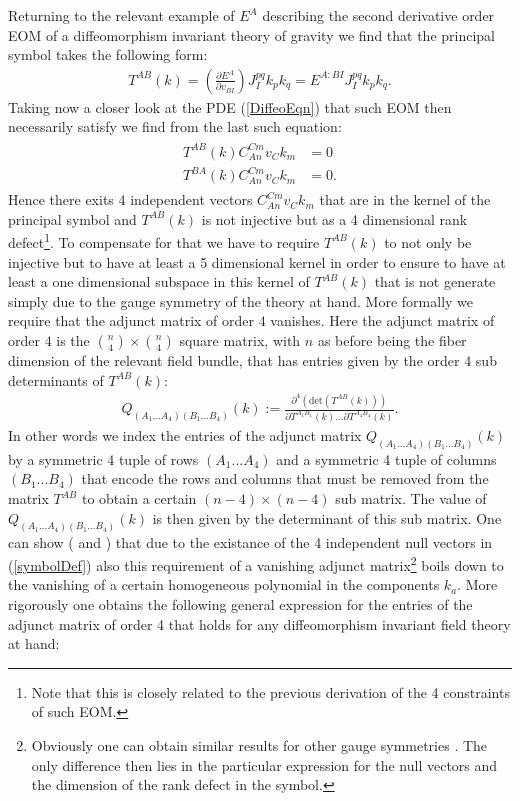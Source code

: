 \documentclass[a4paper,12pt, DIV=14, BCOR=5mm, twoside, headsepline, numbers=noenddot]{scrbook}
\begin{document}
Returning to the relevant example of $E^A$ describing the second derivative order EOM of a diffeomorphism invariant theory of gravity we find that the principal symbol takes the following form:
\begin{align}
    T^{A B} (k) = \left (\frac{\partial E^A}{\partial v_{BI}} \right )J_I^{pq} k_p k_q = E^{A: BI} J_I^{pq} k_p k_q.
\end{align}
Taking now a closer look at the PDE (\ref{DiffeoEqn}) that such EOM then necessarily  satisfy we find from the last such equation:
\begin{align}\label{symbolDef}
\begin{aligned}
    T^{A B} (k) C_{An}^{Cm}v_Ck_m &= 0 \\
    T^{B A} (k) C_{An}^{Cm}v_Ck_m &= 0 .
\end{aligned}
\end{align}
Hence there exits 4 independent vectors $C_{An}^{Cm}v_Ck_m$ that are in the kernel of the principal symbol and $T^{AB}(k)$ is not injective but as a 4 dimensional rank defect\footnote{Note that this is closely related to the previous derivation of the 4 constraints of such EOM.}. To compensate for that we have to require $T^{AB}(k)$ to not only be injective but to have at least a 5 dimensional kernel in order to ensure to have at least a one dimensional subspace in this kernel of $T^{AB}(k)$ that is not generate simply due to the gauge symmetry of the theory at hand. More formally we require that the adjunct matrix of order $4$ vanishes. Here the adjunct matrix of order $4$ is the $\binom{n}{4} \times \binom{n}{4}$ square matrix, with $n$ as before being the fiber dimension of the relevant field bundle, that has entries given by the order $4$ sub determinants of $T^{AB}(k)$:
\begin{align}\label{MinorDef}
    Q_{(A_1...A_4) (B_1...B_4)}(k) := \frac{\partial^4 (\mathrm{det}(T^{AB}(k)))}{\partial T^{A_1 B_1}(k) ... \partial T^{A_4 B_4}(k)}.
\end{align}
In other words we index the entries of the adjunct matrix $Q_{(A_1...A_4) (B_1...B_4)}(k)$ by a symmetric 4 tuple of rows $(A_1...A_4)$ and a symmetric 4 tuple of columns $(B_1...B_4)$ that encode the rows and columns that must be removed from the matrix $T^{AB}$ to obtain a certain $(n-4) \times (n-4)$ sub matrix. The value of $Q_{(A_1...A_4) (B_1...B_4)}(k)$ is then given by the determinant of this sub matrix. 
%
%
%
One can show (\cite{2018PhRvD..97h4036D} and \cite{2009JPhA...42U5402I}) that due to the existance of the 4 independent null vectors in (\ref{symbolDef}) also this requirement of a vanishing adjunct matrix\footnote{Obviously one can obtain similar results for other gauge symmetries \cite{2018PhRvD..97h4036D}. The only difference then lies in the particular expression for the null vectors and the dimension of the rank defect in the symbol.} boils down to the vanishing of a certain homogeneous polynomial in the components $k_a$. More rigorously one obtains the following general expression for the entries of the adjunct matrix of order 4 that holds for any diffeomorphism invariant field theory at hand:
\end{document}
